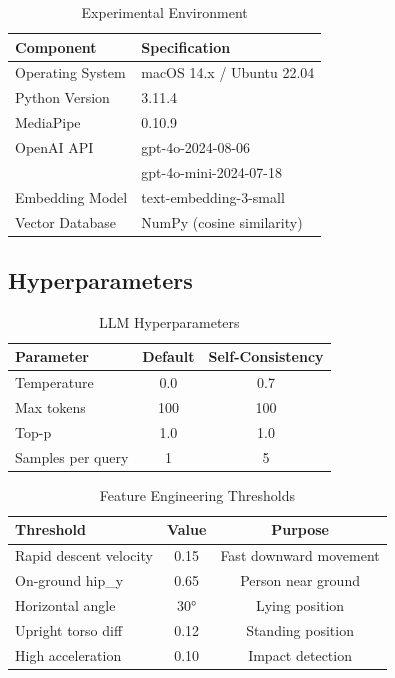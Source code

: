 \documentclass[conference]{IEEEtran}
\begin{document}
\begin{table}[!t]
\centering
\caption{Experimental Environment}
\label{tab:environment}
\begin{tabular}{ll}
\toprule
\textbf{Component} & \textbf{Specification} \\
\midrule
Operating System & macOS 14.x / Ubuntu 22.04 \\
Python Version & 3.11.4 \\
MediaPipe & 0.10.9 \\
OpenAI API & gpt-4o-2024-08-06 \\
 & gpt-4o-mini-2024-07-18 \\
Embedding Model & text-embedding-3-small \\
Vector Database & NumPy (cosine similarity) \\
\bottomrule
\end{tabular}
\end{table}

\subsection{Hyperparameters}

\begin{table}[!t]
\centering
\caption{LLM Hyperparameters}
\label{tab:hyperparams}
\begin{tabular}{lcc}
\toprule
\textbf{Parameter} & \textbf{Default} & \textbf{Self-Consistency} \\
\midrule
Temperature & 0.0 & 0.7 \\
Max tokens & 100 & 100 \\
Top-p & 1.0 & 1.0 \\
Samples per query & 1 & 5 \\
\bottomrule
\end{tabular}
\end{table}

\begin{table}[!t]
\centering
\caption{Feature Engineering Thresholds}
\label{tab:thresholds}
\begin{tabular}{lcc}
\toprule
\textbf{Threshold} & \textbf{Value} & \textbf{Purpose} \\
\midrule
Rapid descent velocity & 0.15 & Fast downward movement \\
On-ground hip\_y & 0.65 & Person near ground \\
Horizontal angle & 30° & Lying position \\
Upright torso diff & 0.12 & Standing position \\
High acceleration & 0.10 & Impact detection \\
\bottomrule
\end{tabular}
\end{table}
\end{document}
